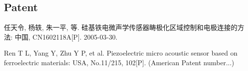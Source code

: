 \begin{resume}
  \subsection*{\textbf{Patent}}

  \begin{achievements}
    \item 任天令, 杨轶, 朱一平, 等. 硅基铁电微声学传感器畴极化区域控制和电极连接的方法: 中国, CN1602118A[P]. 2005-03-30.
    \item Ren T L, Yang Y, Zhu Y P, et al. Piezoelectric micro acoustic sensor based on ferroelectric materials: USA, No.11/215, 102[P]. (American Patent number...)
  \end{achievements}

\end{resume}

